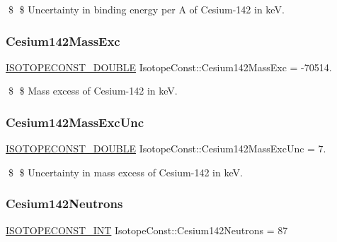 \$ \$ Uncertainty in binding energy per A of Cesium-\/142 in keV. \mbox{\label{group___isotope_const-_cesium-_cs142_ga474b974a115b0b276163d383e27103f6}} 
\subsubsection{\texorpdfstring{Cesium142\+Mass\+Exc}{Cesium142MassExc}}
{\footnotesize\ttfamily \mbox{\hyperlink{group___isotope_const-_macros_ga8f45a7272ce02c0b4c65c44636ed719a}{I\+S\+O\+T\+O\+P\+E\+C\+O\+N\+S\+T\+\_\+\+D\+O\+U\+B\+LE}} Isotope\+Const\+::\+Cesium142\+Mass\+Exc = -\/70514.}

\$ \$ Mass excess of Cesium-\/142 in keV. \mbox{\label{group___isotope_const-_cesium-_cs142_ga0ae91a7b9cb70c3e973c9a8a1bce6a77}} 
\subsubsection{\texorpdfstring{Cesium142\+Mass\+Exc\+Unc}{Cesium142MassExcUnc}}
{\footnotesize\ttfamily \mbox{\hyperlink{group___isotope_const-_macros_ga8f45a7272ce02c0b4c65c44636ed719a}{I\+S\+O\+T\+O\+P\+E\+C\+O\+N\+S\+T\+\_\+\+D\+O\+U\+B\+LE}} Isotope\+Const\+::\+Cesium142\+Mass\+Exc\+Unc = 7.}

\$ \$ Uncertainty in mass excess of Cesium-\/142 in keV. \mbox{\label{group___isotope_const-_cesium-_cs142_ga214005c4a0903349e7e71f9b1d52da51}} 
\subsubsection{\texorpdfstring{Cesium142\+Neutrons}{Cesium142Neutrons}}
{\footnotesize\ttfamily \mbox{\hyperlink{group___isotope_const-_macros_ga5f18360b3e99483a35c32d789e62621c}{I\+S\+O\+T\+O\+P\+E\+C\+O\+N\+S\+T\+\_\+\+I\+NT}} Isotope\+Const\+::\+Cesium142\+Neutrons = 87}

